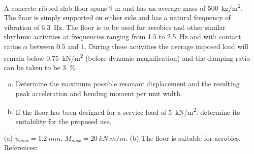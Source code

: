 
\begin{Exercise}[label={footfall_analysis}]
A concrete ribbed slab floor spans 9 m and has an average mass of \SI{500}{kg/m^2}. The floor is simply supported on either side and has a natural frequency of vibration of \SI{6.3}{Hz}. 
The floor is to be used for aerobics and other similar rhythmic activities at frequencies ranging from 1.5 to \SI{2.5}{Hz} and with contact ratios $\alpha$ between 0.5 and 1. During these activities the average imposed load will remain below \SI{0.75}{kN/m^2} (before dynamic magnification) and the damping ratio can be taken to be \SI{3}{\%}.

\begin{enumerate}[(a)]
    \item Determine the maximum possible resonant displacement and the resulting peak acceleration and bending moment per unit width.
    \item If the floor has been designed for a service load of \SI{5}{kN/m^2}, determine its suitability for the proposed use.
\end{enumerate}

\begin{center}
\hspace{1em}
\end{center}

\shortAnswer (a) $u_{max} = \SI{1.2}{mm}$, $M_{max} = \SI{20}{kN.m/m}$. (b) The floor is suitable for aerobics.\\
References: \cite{chopra}
\end{Exercise}




